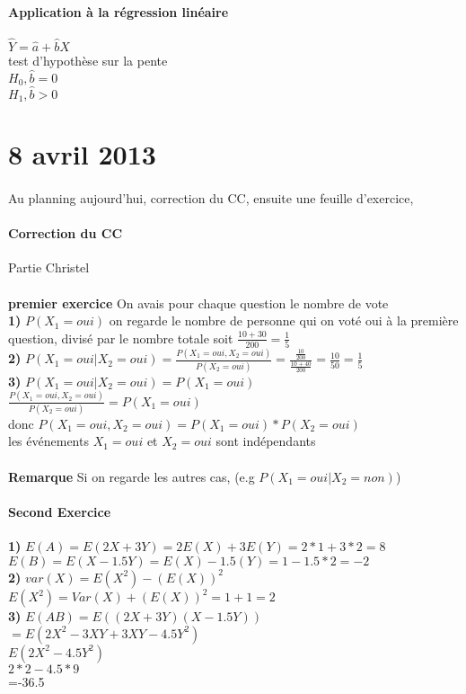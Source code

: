 \documentclass{article}
\begin{document}
\paragraph{Application à la régression linéaire}
$\hat{Y}= \hat{a}+\hat{b}X$\\test d'hypothèse sur la pente\\
$H_0,\hat{b}=0$\\
$H_1,\hat{b}>0$\\
\newpage
\section{8 avril 2013}
\paragraph{} Au planning aujourd'hui, correction du CC, ensuite une feuille d'exercice, 
\paragraph{Correction du CC} Partie Christel\\\\
\textbf{premier exercice} On avais pour chaque question le nombre de vote\\
\textbf{1)} $P(X_1=oui)$ on regarde le nombre de personne qui on voté oui à la première question, divisé par le nombre totale soit $\frac{10+30}{200} =  \frac{1}{5}$\\
\textbf{2)} $P(X_1=oui |X_2 = oui)=  \frac{P(X_1=oui,X_2=oui)}{P(X_2=oui)} =  \frac{\frac{10}{200}}{\frac{10+40}{200	}} = \frac{10}{50} = \frac{1}{5}$ \\
\textbf{3)} $P(X_1=oui | X_2=oui) = P(X_1 = oui)$\\
$\frac{P(X_1=oui,X_2=oui)}{P(X_2=oui)} =P(X_1=oui)$\\
donc $P(X_1=oui,X_2=oui) = P(X_1=oui)*P(X_2=oui)$\\
les événements $X_1=oui$ et $X_2=oui$ sont indépendants\\\\
\textbf{Remarque} Si on regarde les autres cas, (e.g $P(X_1=oui|X_2=non)$)

\paragraph{Second Exercice} \textbf{1)} $E(A)= E(2X+3Y)  = 2E(X)+3E(Y) = 2*1+3*2=8$\\
$E(B) = E(X-1.5Y)=E(X) - 1.5(Y) = 1-1.5*2 = -2$\\
\textbf{2)} $var(X)  = E(X^2)-(E(X))^2$\\$E(X^2)=Var(X)+(E(X))^2 = 1+1 = 2$\\
\textbf{3)} $E(AB) = E((2X+3Y)(X-1.5Y))$\\$=E(2X^2-3XY+3XY-4.5Y^2)$\\
$E(2X^2-4.5Y^2)$\\
$2*2-4.5*9$\\=-36.5
\end{document}

